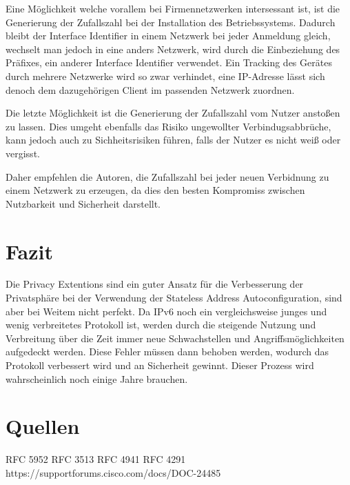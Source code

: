 \documentclass[a4paper, 12pt]{scrartcl}
\begin{document}
Eine Möglichkeit welche vorallem bei Firmennetzwerken intersessant ist, ist die Generierung der Zufallszahl bei der Installation des Betriebssystems. Dadurch bleibt der Interface Identifier in einem Netzwerk bei jeder Anmeldung gleich, wechselt man jedoch in eine anders Netzwerk, wird durch die Einbeziehung des Präfixes, ein anderer Interface Identifier verwendet. 
Ein Tracking des Gerätes durch mehrere Netzwerke wird so zwar verhindet, eine IP-Adresse lässt sich denoch dem dazugehörigen Client im passenden Netzwerk zuordnen.

Die letzte Möglichkeit ist die Generierung der Zufallszahl vom Nutzer anstoßen zu lassen. Dies umgeht ebenfalls das Risiko ungewollter Verbindugsabbrüche, kann jedoch auch zu Sichheitsrisiken führen, falls der Nutzer es nicht weiß oder vergisst.

Daher empfehlen die Autoren, die Zufallszahl bei jeder neuen Verbidnung zu einem Netzwerk zu erzeugen, da dies den besten Kompromiss zwischen Nutzbarkeit und Sicherheit darstellt.


\newpage
\section{Fazit}
Die Privacy Extentions sind ein guter Ansatz für die Verbesserung der Privatsphäre bei der Verwendung der Stateless Address Autoconfiguration, sind aber bei Weitem nicht perfekt.
Da IPv6 noch ein vergleichsweise junges und wenig verbreitetes Protokoll ist, werden durch die steigende Nutzung und Verbreitung über die Zeit immer neue Schwachstellen und Angriffsmöglichkeiten aufgedeckt werden.
Diese Fehler müssen dann behoben werden, wodurch das Protokoll verbessert wird und an Sicherheit gewinnt. Dieser Prozess wird wahrscheinlich noch einige Jahre brauchen.


\newpage

\section{Quellen}
RFC 5952
RFC 3513
RFC 4941
RFC 4291
https://supportforums.cisco.com/docs/DOC-24485
{}


\end{document}
